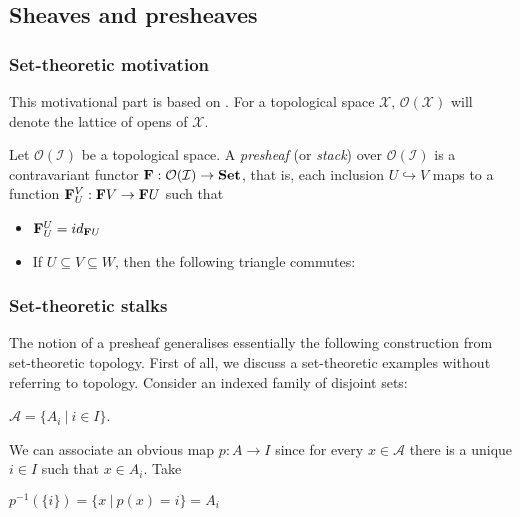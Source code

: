 \documentclass[a4paper]{article}
\theoremstyle{defin}
\theoremstyle{theorem}
\theoremstyle{claim}
\theoremstyle{prop}
\theoremstyle{lemma}
\theoremstyle{fact}
\theoremstyle{ex}
\theoremstyle{col}
\begin{document}
\subsection{Sheaves and presheaves}

\subsubsection{Set-theoretic motivation}

This motivational part is based on \cite[Chapter 14]{goldblatt2014topoi}. For a topological space $\mathcal{X}$, $\mathcal{O}(\mathcal{X})$ will denote the lattice of opens of $\mathcal{X}$.

\vspace{\baselineskip}

Let $\mathcal{O}(\mathcal{I})$ be a topological space. A \emph{presheaf} (or \emph{stack}) over $\mathcal{O}(\mathcal{I})$ is a contravariant functor ${\bf F} : \mathcal{O}(\mathcal{I}) \to {\bf Set}$, that is, each inclusion $U \hookrightarrow V$ maps to a function ${\bf F}_U^V : {\bf F} V \to {\bf F} U$ such that
\begin{itemize}
\item ${\bf F}_U^U = id_{{\bf F} U}$
\item If $U \subseteq V \subseteq W$, then the following triangle commutes:

\centerline{
}
\end{itemize}

\subsubsection{Set-theoretic stalks}

The notion of a presheaf generalises essentially the following construction from set-theoretic topology. First of all, we discuss a set-theoretic examples without referring to topology. Consider an indexed family of disjoint sets:
\begin{center}
$\mathcal{A} = \{ A_i \: | \: i \in I \}$.
\end{center}
We can associate an obvious map $p : A \to I$ since for every $x \in \mathcal{A}$ there is a unique $i \in I$ such that $x \in A_i$. Take

\begin{center}
$p^{-1}(\{ i \}) = \{ x \: | \: p(x) = i\} = A_i$
\end{center}
\end{document}
